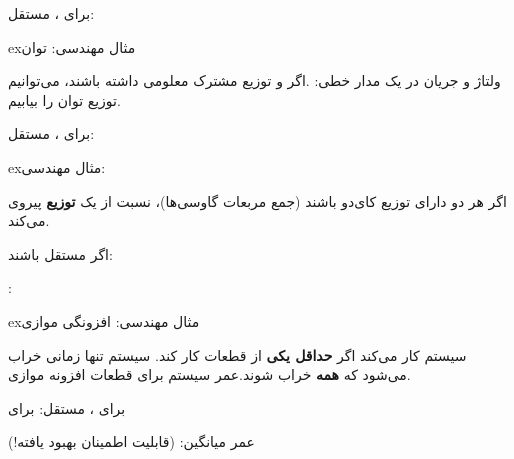 
برای ،  مستقل:

\begin{PSbox}[unbreakable]{ex}{مثال مهندسی: توان}

ولتاژ  و جریان  در یک مدار خطی: .\PSbr{}اگر  و  توزیع مشترک معلومی داشته باشند، می‌توانیم توزیع توان را بیابیم.

\end{PSbox}


برای ،  مستقل:

\begin{PSbox}[unbreakable]{ex}{مثال مهندسی: }


اگر هر دو دارای توزیع کای‌دو باشند (جمع مربعات گاوسی‌ها)، نسبت از یک \textbf{توزیع } پیروی می‌کند.

\end{PSbox}




اگر مستقل باشند: 

: 

\begin{PSbox}[unbreakable]{ex}{مثال مهندسی: افزونگی موازی}

سیستم کار می‌کند اگر \textbf{حداقل یکی} از قطعات کار کند. سیستم تنها زمانی خراب می‌شود که \textbf{همه} خراب شوند.\PSbr{}عمر سیستم  برای قطعات افزونه موازی.

برای ،  مستقل:\PSbr{} برای 


عمر میانگین:  (قابلیت اطمینان بهبود یافته!)

\end{PSbox}

